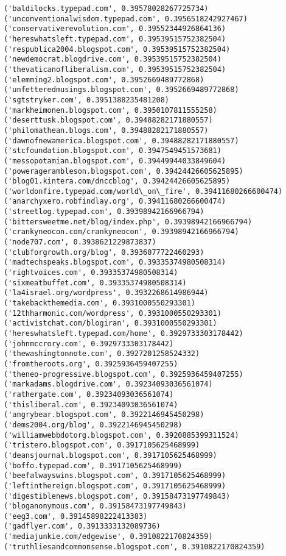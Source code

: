 \documentclass[11pt]{article}
\begin{document}
\begin{Verbatim}[commandchars=\\\{\}]
('baldilocks.typepad.com', 0.39578028267725734)
('unconventionalwisdom.typepad.com', 0.3956518242927467)
('conservativerevolution.com', 0.39552344926864136)
('hereswhatsleft.typepad.com', 0.39539515752382504)
('respublica2004.blogspot.com', 0.39539515752382504)
('newdemocrat.blogdrive.com', 0.39539515752382504)
('thevaticanofliberalism.com', 0.39539515752382504)
('elemming2.blogspot.com', 0.3952669489772868)
('unfetteredmusings.blogspot.com', 0.3952669489772868)
('sgtstryker.com', 0.3951388235481208)
('markheimonen.blogspot.com', 0.3950107811555258)
('deserttusk.blogspot.com', 0.39488282171880557)
('philomathean.blogs.com', 0.39488282171880557)
('dawnofnewamerica.blogspot.com', 0.39488282171880557)
('stcfoundation.blogspot.com', 0.3947549451573681)
('messopotamian.blogspot.com', 0.39449944033849604)
('poweragerambleson.blogspot.com', 0.39424426605625895)
('blog01.kintera.com/dnccblog', 0.39424426605625895)
('worldonfire.typepad.com/world\_on\_fire', 0.39411680266600474)
('anarchyxero.robfindlay.org', 0.39411680266600474)
('streetlog.typepad.com', 0.39398942166966794)
('bittersweetme.net/blog/index.php', 0.39398942166966794)
('crankyneocon.com/crankyneocon', 0.39398942166966794)
('node707.com', 0.3938621229873837)
('clubforgrowth.org/blog', 0.3936077722460293)
('madtechspeaks.blogspot.com', 0.39335374980508314)
('rightvoices.com', 0.39335374980508314)
('sixmeatbuffet.com', 0.39335374980508314)
('la4israel.org/wordpress', 0.3932268614986944)
('takebackthemedia.com', 0.3931000550293301)
('12thharmonic.com/wordpress', 0.3931000550293301)
('activistchat.com/blogiran', 0.3931000550293301)
('hereswhatsleft.typepad.com/home', 0.3929733303178442)
('johnmccrory.com', 0.3929733303178442)
('thewashingtonnote.com', 0.3927201258524332)
('fromtheroots.org', 0.3925936459407255)
('theneo-progressive.blogspot.com', 0.3925936459407255)
('markadams.blogdrive.com', 0.39234093036561074)
('rathergate.com', 0.39234093036561074)
('thisliberal.com', 0.39234093036561074)
('angrybear.blogspot.com', 0.3922146945450298)
('dems2004.org/blog', 0.3922146945450298)
('williamwebbdotorg.blogspot.com', 0.3920885399311524)
('tristero.blogspot.com', 0.3917105625468999)
('deansjournal.blogspot.com', 0.3917105625468999)
('boffo.typepad.com', 0.3917105625468999)
('beefalwayswins.blogspot.com', 0.3917105625468999)
('leftinthereign.blogspot.com', 0.3917105625468999)
('digestiblenews.blogspot.com', 0.39158473197749843)
('bloganonymous.com', 0.39158473197749843)
('eeg3.com', 0.39145898222413383)
('gadflyer.com', 0.3913333132089736)
('mediajunkie.com/edgewise', 0.3910822170824359)
('truthliesandcommonsense.blogspot.com', 0.3910822170824359)

\end{Verbatim}
\end{document}

